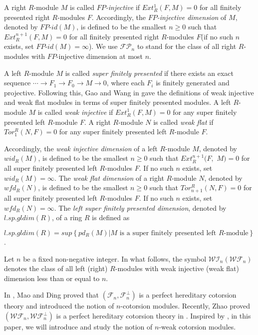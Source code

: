 ﻿\documentclass[
11pt,%
tightenlines,%
twoside,%
onecolumn,%
nofloats,%
nobibnotes,%
nofootinbib,%
superscriptaddress,%
noshowpacs,%
centertags]%
{revtex4}
\begin{document}
A right $R$-module $M$ is called \textit{$FP$-injective} \cite{St}
if $Ext_R^1(F, M)=0$ for all finitely presented right $R$-modules
$F$. Accordingly, the \textit{$FP$-injective dimension} of $M$,
denoted by $FP$-$id(M)$, is defined to be the smallest $n \geq 0$
such that $Ext_R^{n+1}(F, M) = 0$ for all finitely presented right
$R$-modules $F$(if no such $n$ exists, set $FP$-$id(M) = \infty$).
We use $\mathcal{FP}_n$ to stand for the class of all right
$R$-modules with $FP$-injective dimension at most $n$.

A left $R$-module $M$ is called \textit{super finitely presented}
\cite{Ga} if there exists an exact sequence $\cdots \rightarrow F_1
\rightarrow F_0 \rightarrow M \rightarrow 0$, where each $F_i$ is
finitely generated and projective. Following this, Gao and Wang in
\cite{Gao} gave the definitions of weak injective and weak flat
modules in terms of super finitely presented modules. A left
$R$-module $M$ is called \textit{weak injective} if $Ext_R^1(F, M) =
0$ for any super finitely presented left $R$-module $F$. A right
$R$-module $N$ is called \textit{weak flat} if $Tor^R_1(N, F) = 0$
for any super finitely presented left $R$-module $F$.

Accordingly, the \textit{weak injective dimension} of a  left
$R$-module $M$, denoted by $wid_R(M)$, is defined to be the smallest
$n \geq 0$ such that $Ext_R^{n+1}(F,$ $ M) = 0$ for all super
finitely presented left $R$-modules $F$. If no such $n$ exists, set
$wid_R(M) = \infty$. The \textit{weak flat dimension} of a right
$R$-module $N$, denoted by $wfd_R(N)$, is defined to be the smallest
$n \geq 0$ such that $Tor_{n+1}^R(N, F) = 0$ for all super finitely
presented left $R$-modules $F$. If no such $n$ exists, set $wfd_R(N)
= \infty$. The \textit{left super finitely presented dimension},
denoted by $l.sp.gldim(R)$, of a ring $R$ is defined as
\begin{center}
$l.sp.gldim(R) = sup\left\{pd_R(M)  | M \mbox{ is a super finitely presented left } R\mbox{-module}\right\}$.
\end{center}

Let $n$ be a fixed non-negative integer. In what follows,  the
symbol $\mathcal{WI}_n (\mathcal{WF}_n)$ denotes the class of all
left (right) $R$-modules with weak injective (weak flat) dimension
less than or equal to $n$.

In \cite{MD}, Mao and Ding proved that  $(\mathcal{F}_n,
\mathcal{F}_n^\bot)$ is a perfect hereditary cotorsion theory and
introduced the notion of $n$-cotorsion modules. Recently, Zhao
proved $(\mathcal{WF}_n, \mathcal{WF}_n^\bot)$ is a perfect
hereditary cotorsion theory in \cite[Proposition $4.18$]{Zo}.
Inspired by \cite{MD, Zo}, in this paper, we will introduce and
study the notion of $n$-weak cotorsion modules.
\end{document}
